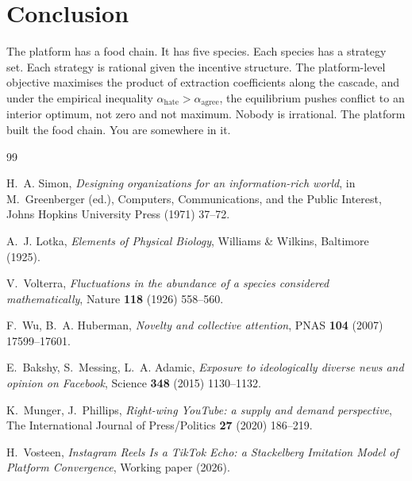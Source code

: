 \documentclass[12pt,a4paper]{article}
\begin{document}
\section{Conclusion}
\label{sec:conclusion}

The platform has a food chain. It has five species. Each species has a strategy set. Each strategy is rational given the incentive structure. The platform-level objective maximises the product of extraction coefficients along the cascade, and under the empirical inequality $\alpha_{\mathrm{hate}} > \alpha_{\mathrm{agree}}$, the equilibrium pushes conflict to an interior optimum, not zero and not maximum. Nobody is irrational. The platform built the food chain. You are somewhere in it.

\vspace{1.2em}


\begin{thebibliography}{99}

H.~A. Simon,
\textit{Designing organizations for an information-rich world},
in M.~Greenberger (ed.), Computers, Communications, and the Public Interest, Johns Hopkins University Press (1971) 37--72.

A.~J. Lotka,
\textit{Elements of Physical Biology},
Williams \& Wilkins, Baltimore (1925).

V.~Volterra,
\textit{Fluctuations in the abundance of a species considered mathematically},
Nature \textbf{118} (1926) 558--560.

F.~Wu, B.~A. Huberman,
\textit{Novelty and collective attention},
PNAS \textbf{104} (2007) 17599--17601.

E.~Bakshy, S.~Messing, L.~A. Adamic,
\textit{Exposure to ideologically diverse news and opinion on Facebook},
Science \textbf{348} (2015) 1130--1132.

K.~Munger, J.~Phillips,
\textit{Right-wing YouTube: a supply and demand perspective},
The International Journal of Press/Politics \textbf{27} (2020) 186--219.

H.~Vosteen,
\textit{Instagram Reels Is a TikTok Echo: a Stackelberg Imitation Model of Platform Convergence},
Working paper (2026).

\end{thebibliography}
\end{document}
